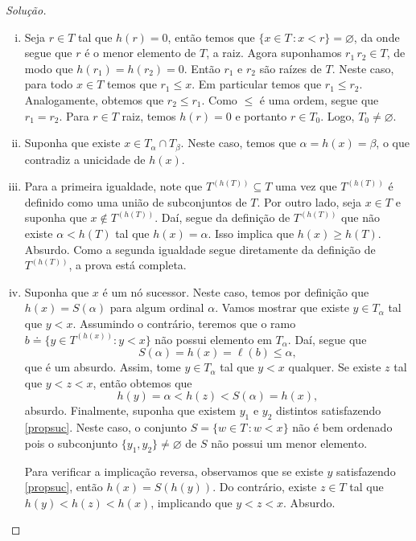 \documentclass[a4paper]{article}
\begin{document}
\begin{proof}[Solução]\hfill
  \begin{enumerate}[(i)]

  \item Seja \(r\in T\) tal que \(h(r)=0\), então temos que \(\{x\in T\,\colon
    x<r\}=\varnothing\), da onde segue que \(r\) é o menor elemento de \(T\), a raiz.
    Agora suponhamos \(r_1\, r_2\in T\), de modo que \(h(r_1)=h(r_2)=0\). Então \(r_1\) e
    \(r_2\) são raízes de \(T\). Neste caso,  para todo \(x\in T\) temos que
    \(r_1\leq x\). Em particular temos que \(r_1\leq r_2\).
    Analogamente, obtemos que \(r_2\leq r_1\). Como \(\leq\) é
    uma ordem, segue que \(r_1=r_2\). Para \(r\in T\) raiz, temos \(h(r)=0\) e portanto
    \(r\in T_0\). Logo, \(T_0\not=\varnothing\).
    
  \item Suponha que existe \(x\in T_\alpha\cap T_\beta\). Neste caso, temos que
    \(\alpha=h(x)=\beta\), o que contradiz a unicidade de \(h(x)\).

  \item Para a primeira igualdade, note que \(T^{(h(T))}\subseteq T\) uma vez
    que \(T^{(h(T))}\) é definido como uma união de subconjuntos de \(T\). Por
    outro lado, seja \(x\in T\) e suponha que \(x\not\in T^{(h(T))}\). Daí,
    segue da definição de \(T^{(h(T))}\) que não existe \(\alpha < h(T)\) tal
    que \(h(x)=\alpha\). Isso implica
    que \(h(x)\geq h(T)\). Absurdo. Como a segunda igualdade segue diretamente da
    definição de \(T^{(h(T))}\), a prova está completa. 

  \item Suponha que \(x\) é um nó sucessor. Neste caso, temos por definição
    que \(h(x)=S(\alpha)\) para algum ordinal \(\alpha\). Vamos mostrar que
    existe \(y\in T_\alpha\) tal que \(y < x\). Assumindo o contrário, teremos
    que o ramo $b\doteq\{y\in T^{(h(x))}: y<x\}$ não possui elemento em
    $T_\alpha$. Daí, segue que \[S(\alpha)=h(x)=\ell(b)\leq\alpha,\] que é um absurdo. 
    Assim, tome $y\in T_\alpha$ tal que $y<x$ qualquer. Se
    existe \(z\) tal que \(y<z<x\), então obtemos
    que \[h(y)=\alpha<h(z)<S(\alpha)=h(x),\] 
    absurdo. Finalmente, suponha que existem \(y_1\) e \(y_2\) distintos satisfazendo
    \eqref{propsuc}. Neste caso, o conjunto \(S=\{w\in
    T\,\colon w <x\}\) não é bem ordenado pois o subconjunto
    \(\{y_1,y_2\}\not = \varnothing\) de \(S\) não possui um menor elemento.

    Para verificar a implicação reversa, observamos que se existe \(y\) satisfazendo
    \eqref{propsuc}, então \(h(x)=S(h(y))\). Do contrário, existe \(z\in T\) tal
    que \(h(y)<h(z)<h(x)\), implicando que \(y<z<x\). Absurdo.


\end{enumerate}
\end{proof}
\end{document}
